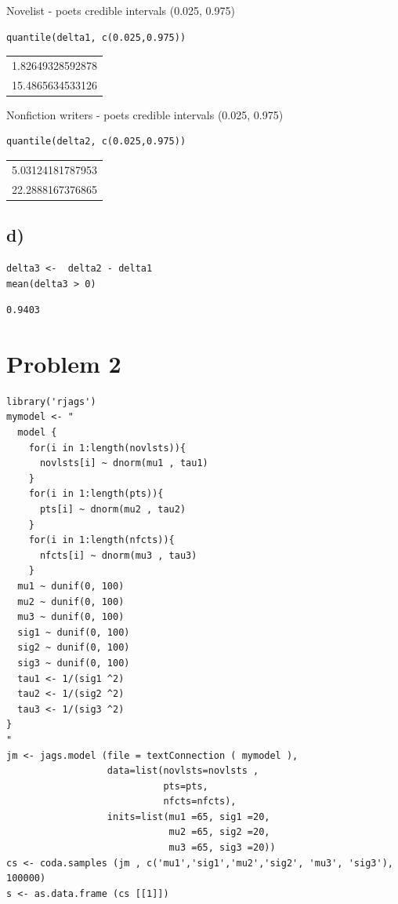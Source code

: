 \documentclass[11pt]{article}
\begin{document}
Novelist - poets credible intervals (0.025, 0.975)
\begin{verbatim}
quantile(delta1, c(0.025,0.975))
\end{verbatim}

\begin{center}
\begin{tabular}{r}
1.82649328592878\\
15.4865634533126\\
\end{tabular}
\end{center}


Nonfiction writers - poets credible intervals (0.025, 0.975)
\begin{verbatim}
quantile(delta2, c(0.025,0.975))
\end{verbatim}

\begin{center}
\begin{tabular}{r}
5.03124181787953\\
22.2888167376865\\
\end{tabular}
\end{center}

\subsection*{d)}
\label{sec:org464e5e3}

\begin{verbatim}
delta3 <-  delta2 - delta1
mean(delta3 > 0)
\end{verbatim}

\begin{verbatim}
0.9403
\end{verbatim}

\section*{Problem 2}
\label{sec:orge425af5}
\begin{verbatim}
library('rjags')
mymodel <- "
  model {
    for(i in 1:length(novlsts)){
      novlsts[i] ~ dnorm(mu1 , tau1)
    }
    for(i in 1:length(pts)){
      pts[i] ~ dnorm(mu2 , tau2)
    }
    for(i in 1:length(nfcts)){
      nfcts[i] ~ dnorm(mu3 , tau3)
    }
  mu1 ~ dunif(0, 100)
  mu2 ~ dunif(0, 100)
  mu3 ~ dunif(0, 100)
  sig1 ~ dunif(0, 100)
  sig2 ~ dunif(0, 100)
  sig3 ~ dunif(0, 100)
  tau1 <- 1/(sig1 ^2)
  tau2 <- 1/(sig2 ^2)
  tau3 <- 1/(sig3 ^2)
}
"
jm <- jags.model (file = textConnection ( mymodel ),
                  data=list(novlsts=novlsts ,
                            pts=pts,
                            nfcts=nfcts),
                  inits=list(mu1 =65, sig1 =20,
                             mu2 =65, sig2 =20,
                             mu3 =65, sig3 =20))
cs <- coda.samples (jm , c('mu1','sig1','mu2','sig2', 'mu3', 'sig3'), 100000)
s <- as.data.frame (cs [[1]])
\end{verbatim}
\end{document}
